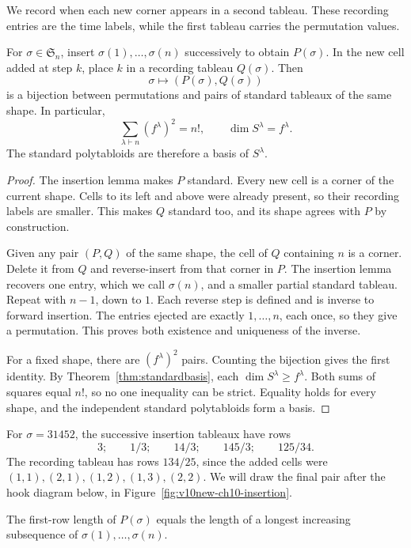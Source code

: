 We record when each new corner appears in a second tableau. These recording entries are the time labels, while the first tableau carries the permutation values.

\begin{theorem}\label{thm:rs}
For $\sigma\in\mathfrak S_n$, insert $\sigma(1),\ldots,\sigma(n)$ successively to obtain $P(\sigma)$. In the new cell added at step $k$, place $k$ in a recording tableau $Q(\sigma)$. Then
\[
\sigma\longmapsto(P(\sigma),Q(\sigma))
\]
is a bijection between permutations and pairs of standard tableaux of the same shape. In particular,
\[
\sum_{\lambda\vdash n}(f^\lambda)^2=n!,
\qquad \dim S^\lambda=f^\lambda.
\]
The standard polytabloids are therefore a basis of $S^\lambda$.
\end{theorem}

\begin{proof}
The insertion lemma makes $P$ standard. Every new cell is a corner of the current shape. Cells to its left and above were already present, so their recording labels are smaller. This makes $Q$ standard too, and its shape agrees with $P$ by construction.

Given any pair $(P,Q)$ of the same shape, the cell of $Q$ containing $n$ is a corner. Delete it from $Q$ and reverse-insert from that corner in $P$. The insertion lemma recovers one entry, which we call $\sigma(n)$, and a smaller partial standard tableau. Repeat with $n-1$, down to $1$. Each reverse step is defined and is inverse to forward insertion. The entries ejected are exactly $1,\ldots,n$, each once, so they give a permutation. This proves both existence and uniqueness of the inverse.

For a fixed shape, there are $(f^\lambda)^2$ pairs. Counting the bijection gives the first identity. By Theorem~\ref{thm:standardbasis}, each $\dim S^\lambda\ge f^\lambda$. Both sums of squares equal $n!$, so no one inequality can be strict. Equality holds for every shape, and the independent standard polytabloids form a basis.
\end{proof}

For $\sigma=31452$, the successive insertion tableaux have rows
\[
3;\qquad1/3;\qquad14/3;\qquad145/3;\qquad125/34.
\]
The recording tableau has rows $134/25$, since the added cells were $(1,1),(2,1),(1,2),(1,3),(2,2)$. We will draw the final pair after the hook diagram below, in Figure~\ref{fig:v10new-ch10-insertion}.

\begin{theorem}[Schensted, 1961]\label{thm:schensted}
The first-row length of $P(\sigma)$ equals the length of a longest increasing subsequence of $\sigma(1),\ldots,\sigma(n)$.
\end{theorem}

